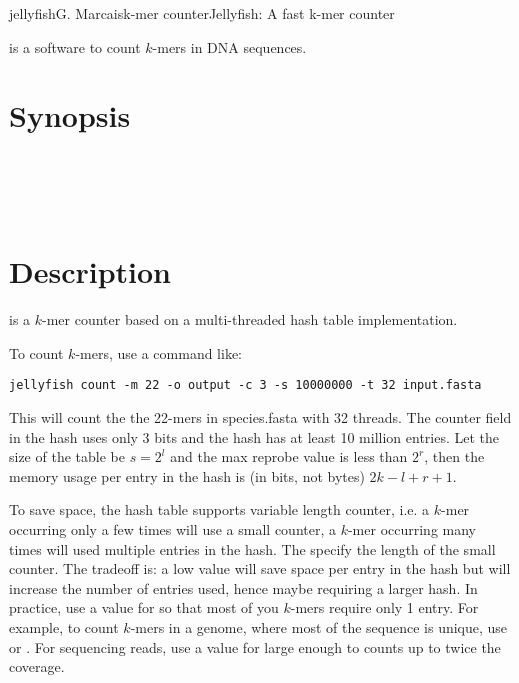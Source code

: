 \documentclass[english]{article}
\begin{document}
\begin{Name}{1}{jellyfish}{G. Marcais}{k-mer counter}{Jellyfish: A fast k-mer counter}

 is a software to count $k$-mers in DNA sequences.

\end{Name}

\section{Synopsis}
        \\
   \Dots \\
   \\
    

\section{Description}

 is a $k$-mer counter based on a multi-threaded hash
table implementation.

To count $k$-mers, use a command like:

\begin{verbatim}
jellyfish count -m 22 -o output -c 3 -s 10000000 -t 32 input.fasta
\end{verbatim}

This will count the the 22-mers in species.fasta with 32 threads. The
counter field in the hash uses only 3 bits and the hash has at least
10 million entries. Let the size of the table be $s=2^l$ and the max
reprobe value is less than $2^r$, then the memory usage per entry in the hash is (in bits, not bytes) $2k-l+r+1$.

To save space, the hash table supports variable length counter, i.e. a
$k$-mer occurring only a few times will use a small counter, a $k$-mer
occurring many times will used multiple entries in the hash. The
 specify the length of the small counter. The tradeoff is: a
low value will save space per entry in the hash but will increase the
number of entries used, hence maybe requiring a larger hash. In
practice, use a value for  so that most of you $k$-mers
require only 1 entry. For example, to count $k$-mers in a genome,
where most of the sequence is unique, use  or
. For sequencing reads, use a value for
 large enough to counts up to twice the coverage.
\end{document}
